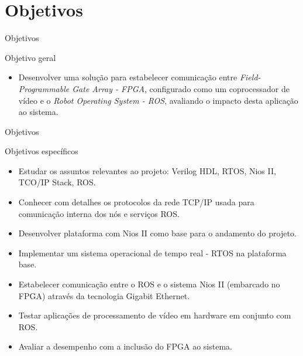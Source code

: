 \documentclass[10pt]{beamer}
\begin{document}
\section{Objetivos}

{
\begin{frame}{Objetivos}
    \begin{alertblock}{Objetivo geral}
    	\begin{itemize}
    	\item Desenvolver uma solução para estabelecer comunicação entre \textit{Field-Programmable Gate Array - FPGA}, configurado como um coprocessador de vídeo e o \textit{Robot Operating System - ROS}, avaliando o impacto desta aplicação ao sistema.
    	\end{itemize}
    \end{alertblock}
\end{frame}
}

{
\begin{frame}{Objetivos}
	\begin{alertblock}{Objetivos específicos}
        \begin{itemize}
        	\item Estudar os assuntos relevantes ao projeto: Verilog HDL, RTOS, Nios II, TCO/IP Stack, ROS.
        	\item Conhecer com detalhes os protocolos da rede TCP/IP usada para comunicação interna dos nós e serviços ROS.
        	\item Desenvolver plataforma com Nios II como base para o andamento do projeto.
        	\item Implementar um sistema operacional de tempo real - RTOS na plataforma base.
        	\item Estabelecer comunicação entre o ROS e o sistema Nios II (embarcado no FPGA) através da tecnologia Gigabit Ethernet.
        	\item Testar aplicações de processamento de vídeo em hardware em conjunto com ROS.
        	\item Avaliar a desempenho com a inclusão do FPGA ao sistema.
        \end{itemize}
	\end{alertblock}
\end{frame}
}


\end{document}
